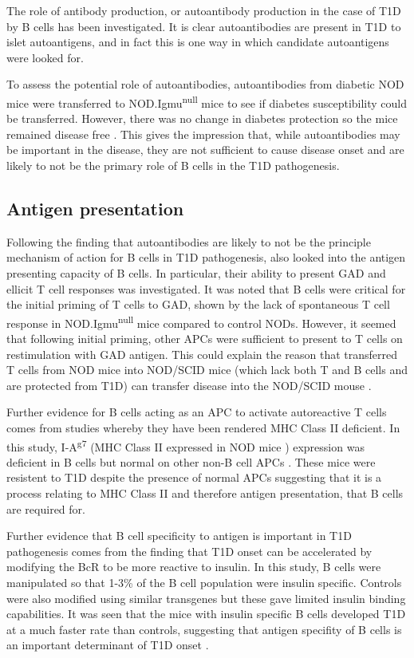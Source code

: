 The role of antibody production, or autoantibody production in the case of T1D by B cells has been investigated.
It is clear autoantibodies are present in T1D to islet autoantigens, and in fact this is one way in which candidate autoantigens were looked for.

To assess the potential role of autoantibodies, autoantibodies from diabetic NOD mice were transferred to NOD.Igmu\textsuperscript{null} mice to see if diabetes susceptibility could be transferred.
However, there was no change in diabetes protection so the mice remained disease free \citep{Serreze1998}.
This gives the impression that, while autoantibodies may be important in the disease, they are not sufficient to cause disease onset and are likely to not be the primary role of B cells in the T1D pathogenesis.

\subsection{Antigen presentation}

Following the finding that autoantibodies are likely to not be the principle mechanism of action for B cells in T1D pathogenesis, \citet{Serreze1998} also looked into the antigen presenting capacity of B cells.
In particular, their ability to present GAD and ellicit T cell responses was investigated.
It was noted that B cells were critical for the initial priming of T cells to GAD, shown by the lack of spontaneous T cell response in NOD.Igmu\textsuperscript{null} mice compared to control NODs.
However, it seemed that following initial priming, other APCs were sufficient to present to T cells on restimulation with GAD antigen.
This could explain the reason that transferred T cells from NOD mice into NOD/SCID mice (which lack both T and B cells and are protected from T1D) can transfer disease into the NOD/SCID mouse \citep{Charlton2001}.

Further evidence for B cells acting as an APC to activate autoreactive T cells comes from studies whereby they have been rendered MHC Class II deficient.
In this study, I-A\textsuperscript{g7} (MHC Class II expressed in NOD mice \citep{Stratmann2005}) expression was deficient in B cells but normal on other non-B cell APCs \citep{Noorchashm1999}.
These mice were resistent to T1D despite the presence of normal APCs suggesting that it is a process relating to MHC Class II and therefore antigen presentation, that B cells are required for.

Further evidence that B cell specificity to antigen is important in T1D pathogenesis comes from the finding that T1D onset can be accelerated by modifying the BcR to be more reactive to insulin.
In this study, B cells were manipulated so that 1-3\% of the B cell population were insulin specific.
Controls were also modified using similar transgenes but these gave limited insulin binding capabilities.
It was seen that the mice with insulin specific B cells developed T1D at a much faster rate than controls, suggesting that antigen specifity of B cells is an important determinant of T1D onset \citep{Hulbert2001}.

